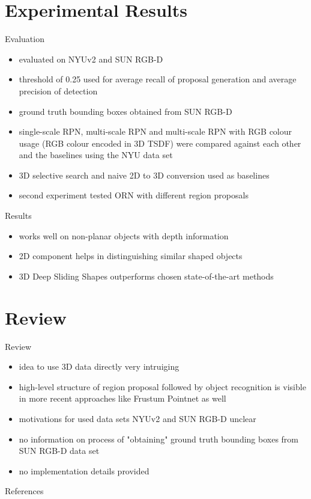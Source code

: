 \documentclass{beamer}
\begin{document}
\section{Experimental Results}
\begin{frame}{Evaluation}
    \begin{itemize}
        \item evaluated on NYUv2\cite{Silberman2012} and SUN RGB-D\cite{Song2015}
        \vfill
        \item threshold of 0.25 used for average recall of proposal generation and
              average precision of detection
        \vfill
        \item ground truth bounding boxes obtained from SUN RGB-D
        \vfill
        \item single-scale RPN, multi-scale RPN and multi-scale RPN with RGB colour
              usage (RGB colour encoded in 3D TSDF) were compared against each
              other and the baselines using the NYU data set
        \vfill
        \item 3D selective search and naive 2D to 3D conversion used as baselines
        \vfill
        \item second experiment tested ORN with different region proposals
    \end{itemize}
\end{frame}

\begin{frame}{Results}
    \begin{itemize}
        \item works well on non-planar objects with depth information
        \vfill
        \item 2D component helps in distinguishing similar shaped objects
        \vfill
        \item 3D Deep Sliding Shapes outperforms chosen state-of-the-art methods
    \end{itemize}
\end{frame}

\section{Review}
\begin{frame}{Review}
    \begin{itemize}
        \item idea to use 3D data directly very intruiging
        \vfill
        \item high-level structure of region proposal followed by object recognition
              is visible in more recent approaches like Frustum Pointnet\cite{Qi2017}
              as well
        \vfill
        \item motivations for used data sets NYUv2 and SUN RGB-D unclear
        \vfill
        \item no information on process of "obtaining" ground truth bounding boxes
              from SUN RGB-D data set
        \vfill
        \item no implementation details provided
    \end{itemize}
\end{frame}

\begin{frame}{References}
    \printbibliography
\end{frame}
\end{document}
